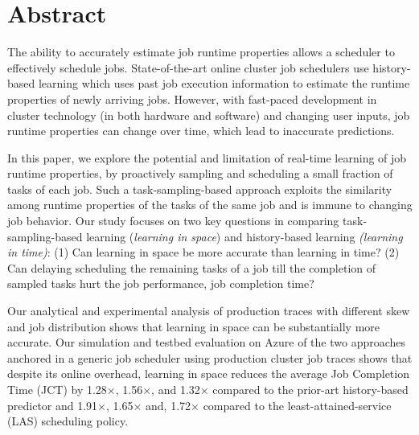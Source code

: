 \section*{Abstract}
The ability to accurately estimate job runtime properties allows a
scheduler to effectively schedule jobs.
State-of-the-art online cluster job schedulers use history-based
learning which uses past job
execution information to estimate the runtime properties of newly arriving 
jobs. However, with fast-paced development in cluster technology (in both
hardware and software) and changing user inputs, job runtime properties
can change over time, which lead to inaccurate predictions.

In this paper, we explore the potential and limitation of real-time learning of
job runtime properties, by proactively sampling and scheduling a small fraction
of tasks of each job. Such a task-sampling-based approach exploits the
similarity among runtime properties of the tasks of the same job and is
immune to changing job behavior.
Our study focuses on two key questions in comparing 
{task-sampling-based learning (\textit{learning in space})} and
history-based learning {\textit{(learning in time)}}:
(1) Can {learning in space} be more accurate than learning in time?
(2) Can {delaying scheduling} the remaining
tasks of a job till the completion of sampled tasks hurt the job performance,
\eg job completion time?

Our analytical and experimental analysis of \numTraces production traces with
different skew and job distribution shows that learning in space can be
substantially more accurate.  Our simulation and testbed evaluation on Azure of
the two approaches anchored in a generic job scheduler using \numTraces
production cluster job traces shows that despite its online overhead, learning
in space reduces the average Job Completion Time (JCT) by 1.28$\times$,
1.56$\times$, and 1.32$\times$ compared to the prior-art history-based
predictor and 1.91$\times$, 1.65$\times$ and, 1.72$\times$ compared to the
least-attained-service (LAS) scheduling policy.


